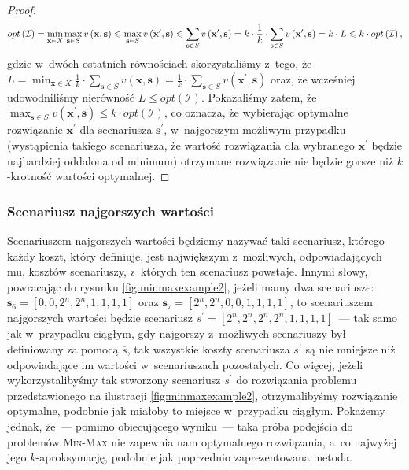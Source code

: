 \begin{proof}
	\begin{eqnarray}
		opt \left( \mathcal{I} \right) = \min_{ \mathclap{\textbf{x} \in X}} \max_{\textbf{s} \in S} v \left( \textbf{x}, \textbf{s} \right) \leqslant \max_{\textbf{s} \in S} v \left( \textbf{x}^{\prime}, \textbf{s} \right) \leqslant \sum_{\textbf{s} \in S} v \left( \textbf{x}^{\prime}, \textbf{s} \right) = k \cdot \frac{1}{k} \cdot \sum_{\textbf{s} \in S} v \left( \textbf{x}^{\prime}, \textbf{s} \right) = k \cdot L \leqslant k \cdot opt \left( \mathcal{I} \right)\text{,}
	\end{eqnarray}
	gdzie w~dwóch ostatnich równościach skorzystaliśmy z~tego, że $L = \min_{ \textbf{x} \in X} \frac{1}{k} \cdot \sum_{\textbf{s} \in S} v \left( \textbf{x}, \textbf{s} \right) = \frac{1}{k} \cdot \sum_{\textbf{s} \in S} v \left( \textbf{x}^{\prime}, \textbf{s} \right)$ oraz, że wcześniej udowodniliśmy nierówność $L \leqslant opt \left( \mathcal{I} \right)$.
	Pokazaliśmy zatem, że $\max_{\textbf{s} \in S} v \left( \textbf{x}^{\prime}, \textbf{s} \right) \leqslant k \cdot opt \left( \mathcal{I} \right)$, co oznacza, że wybierając optymalne rozwiązanie $\textbf{x}^{\prime}$ dla scenariusza $\textbf{s}^{\prime}$, w~najgorszym możliwym przypadku (wystąpienia takiego scenariusza, że wartość rozwiązania dla wybranego $\textbf{x}^{\prime}$ będzie najbardziej oddalona od minimum) otrzymane rozwiązanie nie będzie gorsze niż $k$-krotność wartości optymalnej.
\end{proof}


\subsubsection{Scenariusz najgorszych wartości}


Scenariuszem najgorszych wartości będziemy nazywać taki scenariusz, którego każdy koszt, który definiuje, jest największym z~możliwych, odpowiadających mu, kosztów scenariuszy, z~których ten scenariusz powstaje.
Innymi słowy, powracając do rysunku \ref{fig:minmaxexample2}, jeżeli mamy dwa scenariusze: $\textbf{s}_{6} = \left[ 0, 0, 2^{n}, 2^{n}, 1, 1, 1, 1 \right]$ oraz $\textbf{s}_{7} = \left[ 2^{n}, 2^{n}, 0, 0, 1, 1, 1, 1 \right]$, to scenariuszem najgorszych wartości będzie scenariusz $s^{\prime} = \left[ 2^{n}, 2^{n}, 2^{n}, 2^{n}, 1, 1, 1, 1 \right]$~--- tak samo jak w~przypadku ciągłym, gdy najgorszy z~możliwych scenariuszy był definiowany za pomocą $\overline{s}$, tak wszystkie koszty scenariusza $s^{\prime}$ są nie mniejsze niż odpowiadające im wartości w~scenariuszach pozostałych.
Co więcej, jeżeli wykorzystalibyśmy tak stworzony scenariusz $s^{\prime}$ do rozwiązania problemu przedstawionego na ilustracji \ref{fig:minmaxexample2}, otrzymalibyśmy rozwiązanie optymalne, podobnie jak miałoby to miejsce w~przypadku ciągłym.
Pokażemy jednak, że~--- pomimo obiecującego wyniku~--- taka próba podejścia do problemów \textsc{Min-Max} nie zapewnia nam optymalnego rozwiązania, a~co najwyżej jego $k$-aproksymację, podobnie jak poprzednio zaprezentowana metoda.

